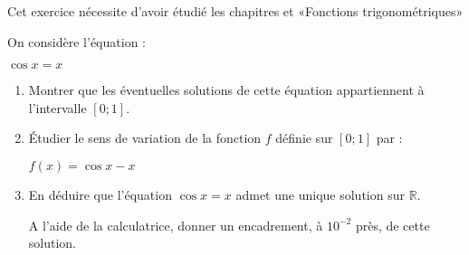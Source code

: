 
%
Cet exercice nécessite d'avoir étudié les chapitres \fg{} et  «Fonctions trigonométriques»
\par
On considère l'équation :
\begin{center}$\cos x = x $\end{center}
\begin{enumerate}
     \item
     Montrer que les éventuelles solutions de cette équation appartiennent à l'intervalle $\left[0 ; 1\right]$.
     \item
     Étudier le sens de variation de la fonction $f$ définie sur $\left[0 ; 1\right]$ par :
     \begin{center}$f\left(x\right) = \cos x-x $\end{center}
     \item
     En déduire que l'équation $\cos x = x$ admet une unique solution sur $\mathbb{R}$.
     \par
     A l'aide de la calculatrice, donner un encadrement, à $10^{-2}$ près, de cette solution.
\end{enumerate}
